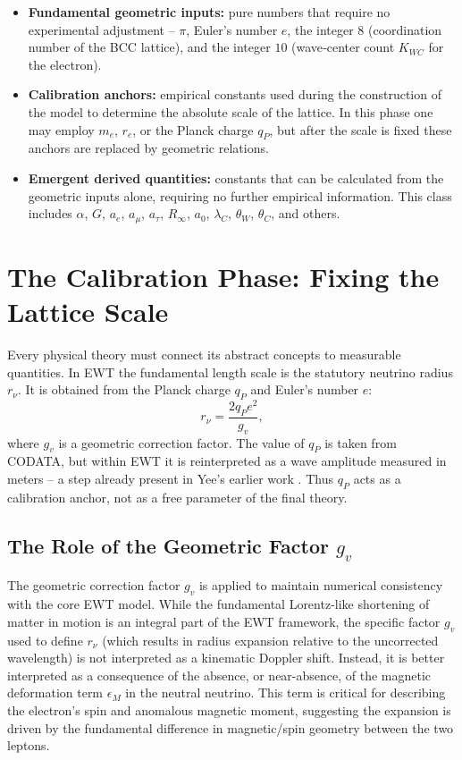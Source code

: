 \documentclass{article}
\begin{document}
	\begin{itemize}
		\item \textbf{Fundamental geometric inputs:} pure numbers that require no experimental adjustment – $\pi$, Euler's number $e$, the integer $8$ (coordination number of the BCC lattice), and the integer $10$ (wave‑center count $K_{WC}$ for the electron).
		\item \textbf{Calibration anchors:} empirical constants used during the construction of the model to determine the absolute scale of the lattice. In this phase one may employ $m_e$, $r_e$, or the Planck charge $q_P$, but after the scale is fixed these anchors are replaced by geometric relations.
		\item \textbf{Emergent derived quantities:} constants that can be calculated from the geometric inputs alone, requiring no further empirical information. This class includes $\alpha$, $G$, $a_e$, $a_\mu$, $a_\tau$, $R_\infty$, $a_0$, $\lambda_C$, $\theta_W$, $\theta_C$, and others.
	\end{itemize}
	
	\section{The Calibration Phase: Fixing the Lattice Scale}
	Every physical theory must connect its abstract concepts to measurable quantities. In EWT the fundamental length scale is the statutory neutrino radius $r_\nu$. It is obtained from the Planck charge $q_P$ and Euler's number $e$:
	\begin{equation}
		r_\nu = \frac{2 q_P e^2}{g_v},
	\end{equation}
	where $g_v$ is a geometric correction factor. The value of $q_P$ is taken from CODATA, but within EWT it is reinterpreted as a wave amplitude measured in meters – a step already present in Yee's earlier work \cite{yee2020constants}. Thus $q_P$ acts as a calibration anchor, not as a free parameter of the final theory.
	
	\subsection{The Role of the Geometric Factor $g_v$}
	The geometric correction factor $g_v$ is applied to maintain numerical consistency with the core EWT model. While the fundamental Lorentz-like shortening of matter in motion is an integral part of the EWT framework, the specific factor $g_v$ used to define $r_\nu$ (which results in radius expansion relative to the uncorrected wavelength) is not interpreted as a kinematic Doppler shift. Instead, it is better interpreted as a consequence of the absence, or near-absence, of the magnetic deformation term $\epsilon_M$ in the neutral neutrino. This term is critical for describing the electron's spin and anomalous magnetic moment, suggesting the expansion is driven by the fundamental difference in magnetic/spin geometry between the two leptons.
	
\end{document}
